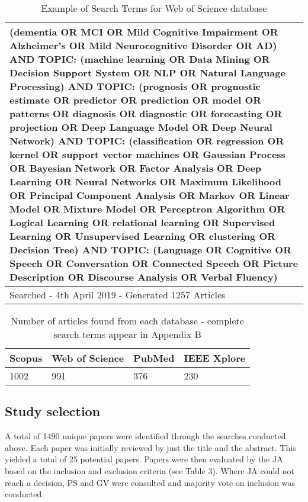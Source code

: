 \documentclass[12pt]{article}
\begin{document}
\begin{table}[H]
	\begin{center}
	\begin{tabular}{ | p{12cm} | }
	\hline
	(dementia OR MCI OR Mild Cognitive Impairment OR Alzheimer's OR Mild Neurocognitive Disorder OR AD) AND TOPIC: (machine learning OR Data Mining OR Decision Support System OR NLP OR Natural 			Language Processing) AND TOPIC: (prognosis OR prognostic estimate OR predictor OR prediction OR model OR patterns OR diagnosis OR diagnostic OR forecasting OR projection OR Deep Language Model 		OR Deep Neural Network) AND TOPIC: (classification OR regression OR kernel OR support vector machines OR Gaussian Process OR Bayesian Network OR Factor Analysis OR Deep Learning OR Neural 			Networks OR Maximum Likelihood OR Principal Component Analysis OR Markov OR Linear Model OR Mixture Model OR Perceptron Algorithm OR Logical Learning OR relational learning OR Supervised 				Learning OR Unsupervised Learning OR clustering OR Decision Tree) AND TOPIC: (Language OR Cognitive OR Speech OR Conversation OR Connected Speech OR Picture Description OR Discourse Analysis OR 		Verbal Fluency)  \\ \hline
	Searched - 4th April 2019 - Generated 1257 Articles \\
	\hline
	\end{tabular}
	\end{center}
	\caption[Table caption text]{Example of Search Terms for Web of Science database}
	\label{table:name}
\end{table}

\begin{table}[H]
	\begin{center}
	\begin{tabular}{ | p{3cm} | p{3cm} | p{3cm} | p{3cm} | }
	\hline
	Scopus & Web of Science & PubMed & IEEE Xplore \\ \hline
	1002 & 991 & 376 & 230 \\ 
	\hline
	\end{tabular}
	\end{center}
	\caption[Table caption text]{Number of articles found from each database - complete search terms appear in Appendix B}
	\label{table:name}
\end{table}

\subsection{Study selection} 
A total of 1490 unique papers were identified through the searches conducted above.  Each paper was initially reviewed by just the title and the abstract. This yielded a total of 25 potential papers. Papers were then evaluated by the JA based on the inclusion and exclusion criteria  (see Table 3). Where JA could not reach a decision, PS and GV were consulted and majority vote on inclusion was conducted.
\end{document}
